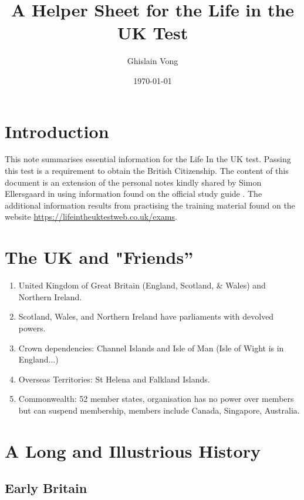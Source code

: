 \documentclass{amsart}
\title{A Helper Sheet for the Life in the UK Test }
\author{Ghislain Vong}
\date{\today}
\begin{document}
\maketitle


\section*{Introduction}
This note summarises essential information for the Life In the UK test. Passing this test is a requirement to obtain the British Citizenship. The content of this document is an  extension of the personal notes kindly  shared by Simon Ellersgaard in \cite{1}  using information found on the official study guide \cite{2}. The additional information results from  practising the training material found on the website \url{https://lifeintheuktestweb.co.uk/exams}.



\section{The UK and "Friends''}

\begin{enumerate}
\item United Kingdom of Great Britain (England, Scotland, \& Wales) and Northern Ireland. 
\item Scotland, Wales, and Northern Ireland have parliaments with devolved powers. 
\item Crown dependencies: Channel Islands and Isle of Man (Isle of Wight is in England...)
\item Overseas Territories: St Helena and Falkland Islands.
\item Commonwealth: 52 member states, organisation has no power over members but can suspend membership, members include Canada, Singapore, Australia.
\end{enumerate}



\section{A Long and Illustrious History}
 


\subsection{Early Britain}
\end{document}
